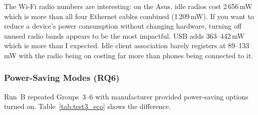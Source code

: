 \noindent The Wi-Fi radio numbers are interesting: on the Asus, idle radios cost 2\,656\,mW which is more than all four Ethernet cables combined (1\,209\,mW). If you want to reduce a device's power consumption without changing hardware, turning off unused radio bands appears to be the most impactful.
\ac{USB} adds 363--442\,mW which is more than I expected. Idle client association barely registers at 89--133\,mW with the radio being on costing far more than phones being connected to it.

\subsubsection*{Power-Saving Modes (RQ6)}
\label{sec:test3-rq6}

Run~B repeated Groups~3--6 with manufacturer provided power-saving options turned on.
Table~\ref{tab:test3_eco} shows the difference.

